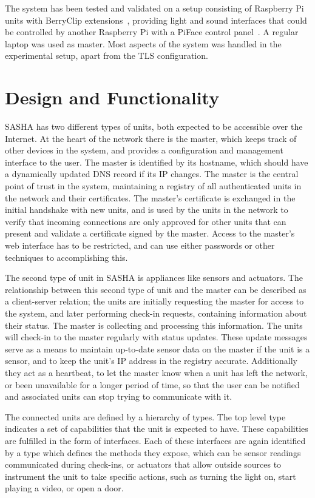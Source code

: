 The system has been tested and validated on a setup consisting of Raspberry Pi units with BerryClip extensions~\cite{berryclip}, providing light and sound interfaces that could be controlled by another Raspberry Pi with a PiFace control panel~\cite{piface}. A regular laptop was used as master. Most aspects of the system was handled in the experimental setup, apart from the TLS configuration.


\section{Design and Functionality}

SASHA has two different types of units, both expected to be accessible over the Internet. At the heart of the network there is the master, which keeps track of other devices in the system, and provides a configuration and management interface to the user. The master is identified by its hostname, which should have a dynamically updated DNS record if its IP changes. The master is the central point of trust in the system, maintaining a registry of all authenticated units in the network and their certificates. The master's certificate is exchanged in the initial handshake with new units, and is used by the units in the network to verify that incoming connections are only approved for other units that can present and validate a certificate signed by the master. Access to the master's web interface has to be restricted, and can use either passwords or other techniques to accomplishing this.

The second type of unit in SASHA is appliances like sensors and actuators. The relationship between this second type of unit and the master can be described as a client-server relation; the units are initially requesting the master for access to the system, and later performing check-in requests, containing information about their status. The master is collecting and processing this information. The units will check-in to the master regularly with status updates. These update messages serve as a means to maintain up-to-date sensor data on the master if the unit is a sensor, and to keep the unit's IP address in the registry accurate. Additionally they act as a heartbeat, to let the master know when a unit has left the network, or been unavailable for a longer period of time, so that the user can be notified and associated units can stop trying to communicate with it.

The connected units are defined by a hierarchy of types. The top level type indicates a set of capabilities that the unit is expected to have. These capabilities are fulfilled in the form of interfaces. Each of these interfaces are again identified by a type which defines the methods they expose, which can be sensor readings communicated during check-ins, or actuators that allow outside sources to instrument the unit to take specific actions, such as turning the light on, start playing a video, or open a door.

